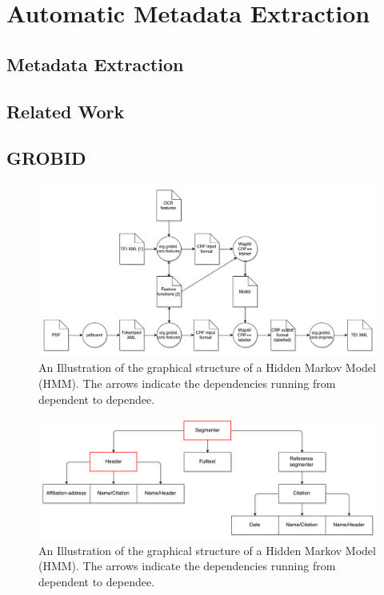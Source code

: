 
\chapter{Automatic Metadata Extraction} %

\label{Chapter3} %



\section{Metadata Extraction}
\section{Related Work}
\section{GROBID}

\begin{figure}[!ht]
\center
\includegraphics[width=6in]{Figures/grobid.pdf}
\caption{An Illustration of the graphical structure of a Hidden Markov Model (HMM). The arrows indicate the dependencies running from dependent to dependee.}
\label{fig:HMM}
\end{figure}

\begin{figure}[!ht]
\center
\includegraphics[width=6in]{Figures/cascade.pdf}
\caption{An Illustration of the graphical structure of a Hidden Markov Model (HMM). The arrows indicate the dependencies running from dependent to dependee.}
\label{fig:HMM}
\end{figure}